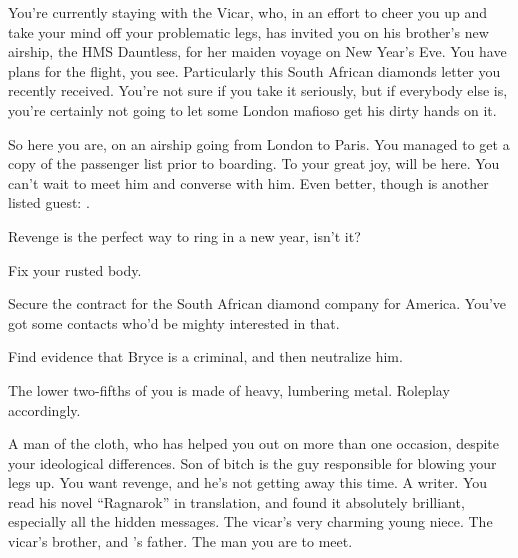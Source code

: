\documentclass[char]{airship}
\begin{document}
You're currently staying with the Vicar, who, in an effort to cheer
you up and take your mind off your problematic legs, has invited you
on his brother's new airship, the HMS Dauntless, for her maiden voyage
on New Year's Eve. You have plans for the flight, you
see. Particularly this South African diamonds letter you recently
received.  You're not sure if you take it seriously, but if everybody
else is, you're certainly not going to let some London mafioso get his
dirty hands on it.

So here you are, on an airship going from London to Paris.  You
managed to get a copy of the passenger list prior to boarding. To your
great joy, \cSaboteur{\intro} will be here. You can't wait to meet him and
converse with him. Even better, though is another listed guest:
{\cDealer{\intro}}.

Revenge is the perfect way to ring in a new year, isn't it?

\begin{itemz}[Goals]
  \item Fix your rusted body.
  \item Secure the contract for the South African diamond company for America.  You've got some contacts who'd be mighty interested in that.
  \item Find evidence that Bryce is a criminal, and then neutralize him.
\end{itemz}

\begin{itemz}[Notes]
  \item The lower two-fifths of you is made of heavy, lumbering metal. Roleplay accordingly.
\end{itemz}


\begin{contacts}
  \contact{\cVicar{}} A man of the cloth, who has helped you out on more than one occasion, despite your ideological differences.
  \contact{\cDealer{}} Son of bitch is the guy responsible for blowing your legs up.  You want revenge, and he's not getting away this time.
  \contact{\cSaboteur{}} A writer.  You read his novel ``Ragnarok'' in translation, and found it absolutely brilliant, especially all the hidden messages.
  \contact{\cThief{}} The vicar's very charming young niece.
  \contact{\cCaptain{}} The vicar's brother, and \cThief{}'s father.
  \contact{\cBoddy{}} The man you are to meet.
\end{contacts}
\end{document}
